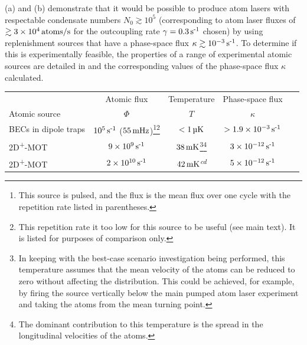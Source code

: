 (a) and (b) demonstrate that it would be possible to produce atom lasers with respectable condensate numbers $N_0 \gtrsim 10^5$ (corresponding to atom laser fluxes of $\gtrsim\unit[3\times 10^4]{atoms/s}$ for the outcoupling rate $\gamma = \unit[0.3]{s\textsuperscript{-1}}$ chosen) by using replenishment sources that have a phase-space flux $\kappa \gtrsim \unit[10^{-3}]{s\textsuperscript{-1}}$.  To determine if this is experimentally feasible, the properties of a range of experimental atomic sources are detailed in  and the corresponding values of the phase-space flux $\kappa$ calculated.

\begin{table}
    \begin{minipage}{\textwidth}
        \renewcommand{\footnoterule}{}
        \centering
        \begin{tabular}{ p{3.8cm} c c c r}
        \toprule
         & Atomic flux   & Temperature  & Phase-space flux  &\\
        Atomic source &  $\Phi$  &  $T$ &  $\kappa$ &\\
        \midrule
        BECs in dipole traps & $\unit[10^5]{s\textsuperscript{-1}}$ ($\unit[55]{mHz}$)\footnote{This source is pulsed, and the flux is the mean flux over one cycle with the repetition rate listed in parentheses.}\footnote{This repetition rate it too low for this source to be useful (see main text). It is listed for purposes of comparison only.} & $<\unit[1]{\micro K}$ & $>\unit[1.9\times 10^{-3}]{s\textsuperscript{-1}}$ &~\citep{Chikkatur:2002qa} \\
        2D\textsuperscript{+}-MOT & $\unit[9\times 10^{9}]{s\textsuperscript{-1}}$ & $\unit[38]{mK}$\footnote{In keeping with the best-case scenario investigation being performed, this temperature assumes that the mean velocity of the atoms can be reduced to zero without affecting the distribution. This could be achieved, for example, by firing the source vertically below the main pumped atom laser experiment and taking the atoms from the mean turning point.}\footnote{The dominant contribution to this temperature is the spread in the longitudinal velocities of the atoms.} & $\unit[3 \times 10^{-12}]{s\textsuperscript{-1}}$ &~\citep{Dieckmann:1998} \\
        2D\textsuperscript{+}-MOT & $\unit[2\times 10^{10}]{s\textsuperscript{-1}}$ & $\unit[42]{mK}$\textsuperscript{\emph{cd}} & $\unit[5 \times 10^{-12}]{s\textsuperscript{-1}}$ &~\citep{Chaudhuri:2006} \\

\end{tabular}
\end{minipage}
\end{table}
